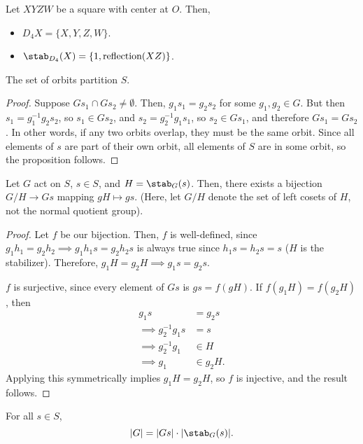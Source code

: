 Let $XYZW$ be a square with center at $O$. Then, 
\begin{itemize}
    \item $D_4X = \{X, Y, Z, W\}$.
    \item $\stab_{D_4}(X) = \{1, \text{reflection}(XZ)\}$.
\end{itemize}

\begin{theorem}
\proplabel

The set of orbits partition $S$. 
\end{theorem}

\begin{proof}
Suppose $Gs_1\cap Gs_2\neq \emptyset$. Then, $g_1s_1 = g_2s_2$ for some $g_1, g_2\in G$. But then $s_1 = g_1^{-1}g_2s_2$, so $s_1\in Gs_2$, and $s_2 = g_2^{-1}g_1s_1$, so $s_2\in Gs_1$, and therefore $Gs_1=Gs_2$. In other words, if any two orbits overlap, they must be the same orbit. Since all elements of $s$ are part of their own orbit, all elements of $S$ are in some orbit, so the proposition follows. 
\end{proof}

\begin{theorem}
\thmlabel

Let $G$ act on $S$, $s\in S$, and $H = \stab_G(s)$. Then, there exists a bijection $G/H\rightarrow Gs$ mapping $gH\mapsto gs$. (Here, let $G/H$ denote the set of left cosets of $H$, not the normal quotient group). 
\end{theorem}

\begin{proof}
Let $f$ be our bijection. Then, $f$ is well-defined, since $g_1h_1=g_2h_2\implies g_1h_1s=g_2h_2s$ is always true since $h_1s = h_2s = s$ ($H$ is the stabilizer). Therefore, $g_1H = g_2H\implies g_1s = g_2s$.

$f$ is surjective, since every element of $Gs$ is $gs = f(gH)$. If $f(g_1H) = f(g_2H)$, then 
\begin{align*}
    g_1s &= g_2s \\
    \implies g_2^{-1}g_1s &= s \\
    \implies g_2^{-1}g_1&\in H \\
    \implies g_1&\in g_2H.
\end{align*}
Applying this symmetrically implies $g_1H = g_2H$, so $f$ is injective, and the result follows.
\end{proof}

\begin{theorem}

For all $s\in S$, 
\[\vert G\vert = \vert Gs\vert \cdot \vert \stab_G(s)\vert.\]
\end{theorem}

